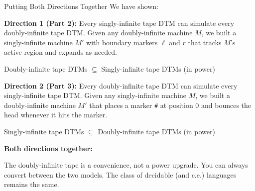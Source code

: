 \begin{conceptbox}{Putting Both Directions Together}
We have shown:

\textbf{Direction 1 (Part 2):} Every singly-infinite tape DTM can simulate
every doubly-infinite tape DTM. Given any doubly-infinite machine $M$, we
built a singly-infinite machine $M'$ with boundary markers $\ell$ and $r$
that tracks $M$'s active region and expands as needed.
\begin{center}
Doubly-infinite tape DTMs $\subseteq$ Singly-infinite tape DTMs (in power)
\end{center}

\textbf{Direction 2 (Part 3):} Every doubly-infinite tape DTM can simulate
every singly-infinite tape DTM. Given any singly-infinite machine $M$, we
built a doubly-infinite machine $M'$ that places a marker \texttt{\#} at
position 0 and bounces the head whenever it hits the marker.
\begin{center}
Singly-infinite tape DTMs $\subseteq$ Doubly-infinite tape DTMs (in power)
\end{center}

\textbf{Both directions together:}

The doubly-infinite tape is a convenience, not a power upgrade. You can always
convert between the two models. The class of decidable (and c.e.) languages
remains the same.
\end{conceptbox}

